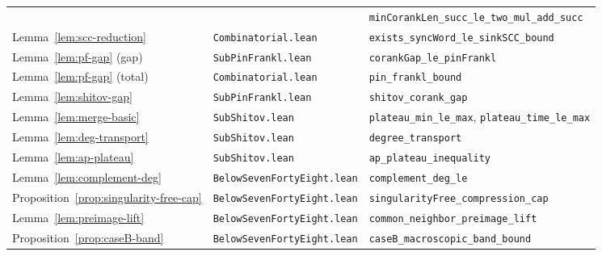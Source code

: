 \documentclass[11pt]{article}
\theoremstyle{definition}
\theoremstyle{remark}
\begin{document}
\begin{table}[ht]
\begin{tabular}{@{}lll@{}}
 & & \texttt{minCorankLen\_succ\_le\_two\_mul\_add\_succ} \\
Lemma~\ref{lem:scc-reduction} & \texttt{Combinatorial.lean} & \texttt{exists\_syncWord\_le\_sinkSCC\_bound} \\
Lemma~\ref{lem:pf-gap} (gap) & \texttt{SubPinFrankl.lean} & \texttt{corankGap\_le\_pinFrankl} \\
Lemma~\ref{lem:pf-gap} (total) & \texttt{Combinatorial.lean} & \texttt{pin\_frankl\_bound} \\
Lemma~\ref{lem:shitov-gap} & \texttt{SubPinFrankl.lean} & \texttt{shitov\_corank\_gap} \\
Lemma~\ref{lem:merge-basic} & \texttt{SubShitov.lean} & \texttt{plateau\_min\_le\_max}, \texttt{plateau\_time\_le\_max} \\
Lemma~\ref{lem:deg-transport} & \texttt{SubShitov.lean} & \texttt{degree\_transport} \\
Lemma~\ref{lem:ap-plateau} & \texttt{SubShitov.lean} & \texttt{ap\_plateau\_inequality} \\
Lemma~\ref{lem:complement-deg} & \texttt{BelowSevenFortyEight.lean} & \texttt{complement\_deg\_le} \\
Proposition~\ref{prop:singularity-free-cap} & \texttt{BelowSevenFortyEight.lean} & \texttt{singularityFree\_compression\_cap} \\
Lemma~\ref{lem:preimage-lift} & \texttt{BelowSevenFortyEight.lean} & \texttt{common\_neighbor\_preimage\_lift} \\
Proposition~\ref{prop:caseB-band} & \texttt{BelowSevenFortyEight.lean} & \texttt{caseB\_macroscopic\_band\_bound} \\
\bottomrule
\end{tabular}
\end{table}
\end{document}
